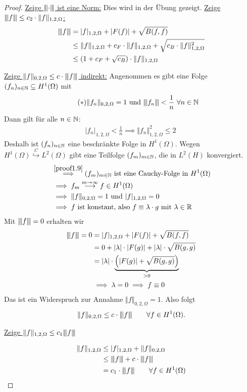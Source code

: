 \begin{proof}
\underline{Zeige $\Vertiii{\cdot}$ ist eine Norm:}
Dies wird in der Übung gezeigt.\nl
\underline{Zeige $\Vertiii{f}\leq c_2\cdot\Vert f\Vert_{1,2,\Omega}$:}
\begin{align*}
\Vertiii{f} &=
|f|_{1,2,\Omega}+|F(f)|+\sqrt{B(f,f)}\\
&\leq
\Vert f\Vert_{1,2,\Omega} +c_F\cdot\Vert f\Vert_{1,2,\Omega}+\sqrt{c_B\cdot\Vert f\Vert^2_{1,2,\Omega}}\\
&\leq
(1+c_F+\sqrt{c_B})\cdot\Vert f\Vert_{1,2,\Omega}
\end{align*}

\underline{Zeige $\Vert f\Vert_{0,2,\Omega}\leq c\cdot\Vertiii{f}$ indirekt:}
Angenommen es gibt eine Folge $(f_n)_{n\in\N}\subseteq H^1(\Omega)$ mit
\begin{align}\label{proof1.9}\tag{$\ast$}
\Vert f_n\Vert_{0,2,\Omega}=1\text{ und }\Vertiii{f_n}<\frac{1}{n}~\forall n\in\N
\end{align}
Dann gilt für alle $n\in\N$:
\begin{align*}
|f_n|_{1,2,\Omega}<\frac{1}{n}
\implies
\Vert f_n\Vert^2_{1,2,\Omega}\leq 2\
\end{align*}
Deshalb ist $(f_n)_{n\in\N}$ eine beschränkte Folge in $H^1(\Omega)$. Wegen $H^1(\Omega)\stackrel{C}{\hookrightarrow} L^2(\Omega)$ gibt eine Teilfolge $(f_m)_{m\in\N}$, die in $L^2(H)$ konvergiert.
\begin{align*}
&\stackrel{\eqref{proof1.9}}{\implies}
(f_m)_{m\in\N}\text{ ist eine Cauchy-Folge in }H^1(\Omega)\\
&\implies
 f_m\stackrel{m\to\infty}{\longrightarrow} f\in H^1(\Omega)\\
 &\implies
 \Vert f\Vert_{0,2,\Omega}=1\text{ und } |f|_{1,2,\Omega}=0\\
 &\implies
 f\text{ ist konstant, also } f\equiv \lambda\cdot g\mit\lambda\in\R
\end{align*}
Mit $\Vertiii{f}=0$ erhalten wir
\begin{align*}
\Vertiii{f} = 0 
&=|f|_{1,2,\Omega}+|F(f)|+\sqrt{B(f,f)}\\
&=0+|\lambda|\cdot|F(g)|+|\lambda|\cdot\sqrt{B(g,g)}\\
&=|\lambda|\cdot\underbrace{\Big(|F(g)|+\sqrt{B(g,g)}\Big)}_{>0}\\
&\implies\lambda=0\implies f\equiv 0
\end{align*}
Das ist ein Widerspruch zur Annahme $\Vert f\Vert_{0,2,\Omega}=1$. Also folgt
\begin{align*}
\Vert f\Vert_{0,2,\Omega}\leq c\cdot\Vertiii{f}\qquad\forall f\in H^1(\Omega).
\end{align*}

\underline{Zeige $\|f\|_{1,2,\Omega}\leq c_1 \Vertiii{f}$}

\begin{align*}
\Vert f\Vert_{1,2,\Omega}
&\leq
|f|_{1,2,\Omega}+\Vert f\Vert_{0,2,\Omega}\\
&\leq
\Vertiii{f}+c\cdot\Vertiii{f}\\
&=c_1\cdot\Vertiii{f}\qquad\forall f\in H^1(\Omega)
\end{align*}
\end{proof}

